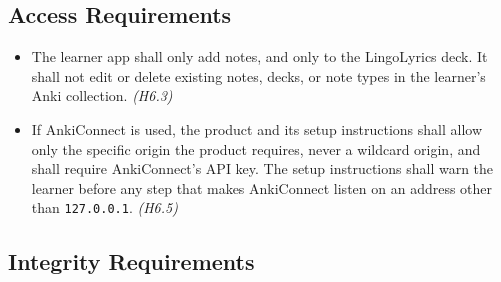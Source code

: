 \documentclass{article}
\begin{document}
\subsection{Access Requirements}

\begin{itemize}
  \item[AC1.] The learner app shall only add notes, and only to the
        LingoLyrics deck. It shall not edit or delete existing notes, decks,
        or note types in the learner's Anki collection. \emph{(H6.3)}
  \item[AC2.] If AnkiConnect is used, the product and its setup instructions
        shall allow only the specific origin the product requires, never a
        wildcard origin, and shall require AnkiConnect's API key. The setup
        instructions shall warn the learner before any step that makes
        AnkiConnect listen on an address other than \texttt{127.0.0.1}.
        \emph{(H6.5)}
\end{itemize}

\subsection{Integrity Requirements}
\end{document}
